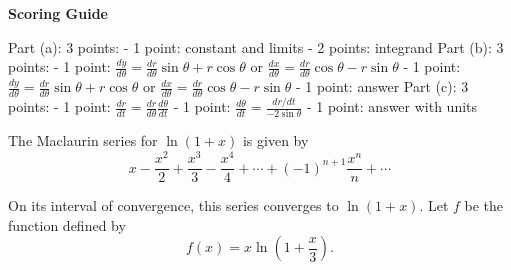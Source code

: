 \documentclass[12pt,addpoints,answers]{exam}
\begin{document}
\begin{questions}
\begin{solution}
\par\medskip
\textbf{Scoring Guide}\par
Part (a): 3 points: - 1 point: constant and limits - 2 points: integrand Part (b): 3 points: - 1 point: $\frac{dy}{d\theta} = \frac{dr}{d\theta}\sin\theta + r\cos\theta$ or $\frac{dx}{d\theta} = \frac{dr}{d\theta}\cos\theta - r\sin\theta$ - 1 point: $\frac{dy}{d\theta} = \frac{dr}{d\theta}\sin\theta + r\cos\theta$ or $\frac{dx}{d\theta} = \frac{dr}{d\theta}\cos\theta - r\sin\theta$ - 1 point: answer Part (c): 3 points: - 1 point: $\frac{dr}{dt} = \frac{dr}{d\theta}\frac{d\theta}{dt}$ - 1 point: $\frac{d\theta}{dt} = \frac{dr/dt}{-2\sin\theta}$ - 1 point: answer with units
\end{solution}

\question
The Maclaurin series for $\ln(1 + x)$ is given by $$x - \frac{x^2}{2} + \frac{x^3}{3} - \frac{x^4}{4} + \cdots + (-1)^{n+1}\frac{x^n}{n} + \cdots$$ \par On its interval of convergence, this series converges to $\ln(1 + x)$. Let $f$ be the function defined by $$f(x) = x \ln\left(1 + \frac{x}{3}\right).$$
\end{questions}
\end{document}
